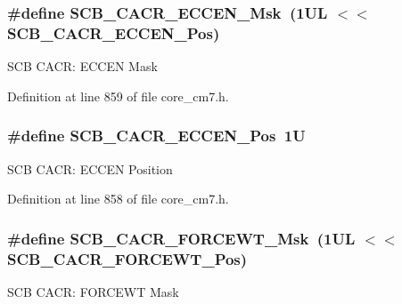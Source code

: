 \subsubsection[{\texorpdfstring{S\+C\+B\+\_\+\+C\+A\+C\+R\+\_\+\+E\+C\+C\+E\+N\+\_\+\+Msk}{SCB_CACR_ECCEN_Msk}}]{\setlength{\rightskip}{0pt plus 5cm}\#define S\+C\+B\+\_\+\+C\+A\+C\+R\+\_\+\+E\+C\+C\+E\+N\+\_\+\+Msk~(1\+U\+L $<$$<$ S\+C\+B\+\_\+\+C\+A\+C\+R\+\_\+\+E\+C\+C\+E\+N\+\_\+\+Pos)}\hypertarget{group___c_m_s_i_s___s_c_b_ga7456a0b93710e8b9fa2b94c946e96c5c}{}\label{group___c_m_s_i_s___s_c_b_ga7456a0b93710e8b9fa2b94c946e96c5c}
S\+CB C\+A\+CR\+: E\+C\+C\+EN Mask 

Definition at line 859 of file core\+\_\+cm7.\+h.

\subsubsection[{\texorpdfstring{S\+C\+B\+\_\+\+C\+A\+C\+R\+\_\+\+E\+C\+C\+E\+N\+\_\+\+Pos}{SCB_CACR_ECCEN_Pos}}]{\setlength{\rightskip}{0pt plus 5cm}\#define S\+C\+B\+\_\+\+C\+A\+C\+R\+\_\+\+E\+C\+C\+E\+N\+\_\+\+Pos~1U}\hypertarget{group___c_m_s_i_s___s_c_b_ga76ce5adcbed2d2d8d425214a1e5d0579}{}\label{group___c_m_s_i_s___s_c_b_ga76ce5adcbed2d2d8d425214a1e5d0579}
S\+CB C\+A\+CR\+: E\+C\+C\+EN Position 

Definition at line 858 of file core\+\_\+cm7.\+h.

\subsubsection[{\texorpdfstring{S\+C\+B\+\_\+\+C\+A\+C\+R\+\_\+\+F\+O\+R\+C\+E\+W\+T\+\_\+\+Msk}{SCB_CACR_FORCEWT_Msk}}]{\setlength{\rightskip}{0pt plus 5cm}\#define S\+C\+B\+\_\+\+C\+A\+C\+R\+\_\+\+F\+O\+R\+C\+E\+W\+T\+\_\+\+Msk~(1\+U\+L $<$$<$ S\+C\+B\+\_\+\+C\+A\+C\+R\+\_\+\+F\+O\+R\+C\+E\+W\+T\+\_\+\+Pos)}\hypertarget{group___c_m_s_i_s___s_c_b_ga0fd9cfb1ef8f44e3edc66fd52309fa7f}{}\label{group___c_m_s_i_s___s_c_b_ga0fd9cfb1ef8f44e3edc66fd52309fa7f}
S\+CB C\+A\+CR\+: F\+O\+R\+C\+E\+WT Mask 

